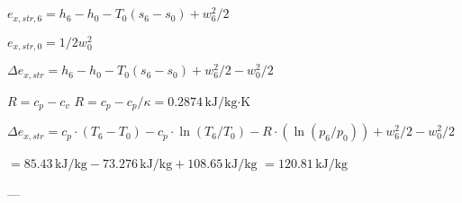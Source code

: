 \( e_{x,str,6} = h_6 - h_0 - T_0 (s_6 - s_0) + w_6^2 / 2 \)  

\( e_{x,str,0} = 1/2 w_0^2 \)  

\( \Delta e_{x,str} = h_6 - h_0 - T_0 (s_6 - s_0) + w_6^2 / 2 - w_0^2 / 2 \)  

\( R = c_p - c_v \)  
\( R = c_p - c_p / \kappa = 0.2874 \, \text{kJ/kg·K} \)  

\( \Delta e_{x,str} = c_p \cdot (T_6 - T_0) - c_p \cdot \ln(T_6 / T_0) - R \cdot (\ln(p_6 / p_0)) + w_6^2 / 2 - w_0^2 / 2 \)  

\( = 85.43 \, \text{kJ/kg} - 73.276 \, \text{kJ/kg} + 108.65 \, \text{kJ/kg} \)  
\( = 120.81 \, \text{kJ/kg} \)  

---
